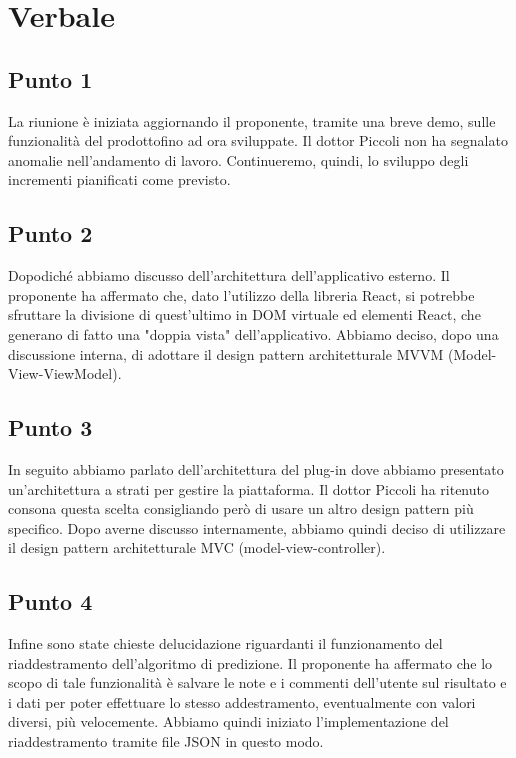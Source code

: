 \section{Verbale}
        \subsection{Punto 1}
            La riunione è iniziata aggiornando il proponente, tramite una breve demo, sulle funzionalità del prodotto\glosp fino ad ora sviluppate. Il dottor Piccoli non ha segnalato anomalie nell'andamento di lavoro. Continueremo, quindi, lo sviluppo degli incrementi pianificati come previsto.
        \subsection{Punto 2}
            Dopodiché abbiamo discusso dell'architettura dell'applicativo esterno. Il proponente ha affermato che, dato l'utilizzo della libreria React, si potrebbe sfruttare la divisione di quest'ultimo in DOM virtuale ed elementi React, che generano di fatto una "doppia vista" dell'applicativo. Abbiamo deciso, dopo una discussione interna, di adottare il design pattern architetturale MVVM (Model-View-ViewModel).
        \subsection{Punto 3}
            In seguito abbiamo parlato dell'architettura del plug-in dove abbiamo presentato un'architettura a strati per gestire la piattaforma. Il dottor Piccoli ha ritenuto consona questa scelta consigliando però di usare un altro design pattern più specifico. Dopo averne discusso internamente, abbiamo quindi deciso di utilizzare il design pattern architetturale MVC (model-view-controller).
        \subsection{Punto 4}
            Infine sono state chieste delucidazione riguardanti il funzionamento del riaddestramento dell'algoritmo di predizione. Il proponente ha affermato che lo scopo di tale funzionalità è salvare le note e i commenti dell'utente sul risultato e i dati per poter effettuare lo stesso addestramento, eventualmente con valori diversi, più velocemente. Abbiamo quindi iniziato l'implementazione del riaddestramento tramite file JSON in questo modo.